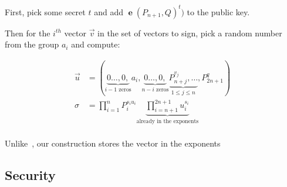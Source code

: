 \documentclass[pdftex,12pt,a4papaer,twoside,notitlepage]{report}
\DeclareMathOperator{\e}{\mathbf{e}}
\begin{document}
First, pick some secret $t$ and add $\e(P_{n+1}, Q)^t)$ to the public key.

Then for the $i^{\mathit{th}}$ vector $\vec{v}$ in the set of vectors to sign,
pick a random number from the group $a_i$ and compute:

\begin{align*}
  \vec{u} &= \left(\underbrace{0\ldots, 0,}_{i-1 \text{ zeros}} a_i, \underbrace{0\dots, 0,}_{n-i \text{ zeros}} \underbrace{P_{n+j}^{v_j},\dots}_{ 1 \le j \le n}, P_{2n+1}^q\right) \\
  \sigma &= \prod_{i=1}^n{P_i^{s_i u_i}}\underbrace{\prod_{i=n+1}^{2n+1}{u_i^{s_i}}}_{\text{already in the exponents}} \\
\end{align*}

Unlike~\cite{signature}, our construction stores the vector in the exponents

\subsection{Security}




\end{document}
